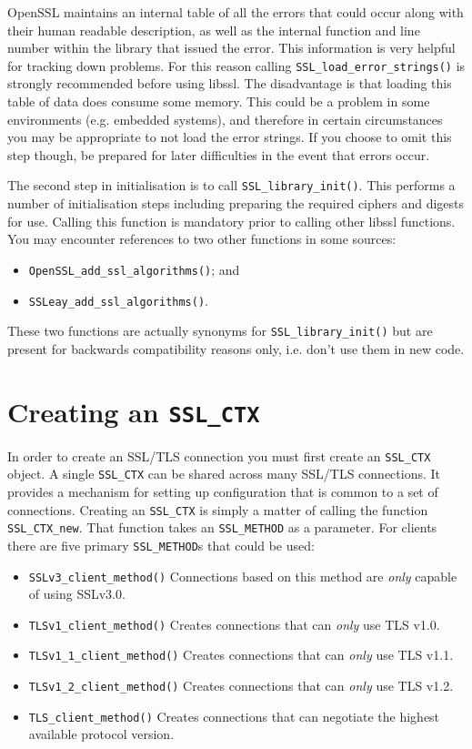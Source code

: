 OpenSSL maintains an internal table of all the errors that could occur along 
with their human readable description, as well as the internal function and 
line number within the library that issued the error. This information is very 
helpful for tracking down problems. For this reason calling 
\verb!SSL_load_error_strings()! is strongly recommended before using 
libssl. The disadvantage is that loading this table of data does consume some 
memory. This could be a problem in some environments (e.g. embedded systems), 
and therefore in certain circumstances you may be appropriate to not load the
error strings. If you choose to omit this step though, be prepared for later 
difficulties in the event that errors occur.

The second step in initialisation is to call \verb!SSL_library_init()!. 
This performs a number of initialisation steps including preparing the required 
ciphers and digests for use. Calling this function is mandatory prior to 
calling other libssl functions. You may encounter references to two other 
functions in some sources:
\begin{itemize}
\item\verb!OpenSSL_add_ssl_algorithms()!; and 
\item\verb!SSLeay_add_ssl_algorithms()!.
\end{itemize}
These two functions are actually  synonyms for \verb!SSL_library_init()! but are
present for backwards compatibility reasons only, i.e. don't use them in new
code.

\section{Creating an \texttt{SSL\_CTX}}

In order to create an SSL/TLS connection you must first create an
\verb!SSL_CTX! object. A single \verb!SSL_CTX! can be shared across
many SSL/TLS connections. It provides a mechanism for setting up configuration
that is common to a set of connections. Creating an \verb!SSL_CTX! is 
simply a matter of calling the function \verb!SSL_CTX_new!. That function 
takes an \verb!SSL_METHOD! as a parameter. For clients there are five 
primary \verb!SSL_METHOD!s that could be used:
\begin{itemize}
\item \verb!SSLv3_client_method()! Connections based on this method are 
\emph{only} capable of using SSLv3.0.
\item \verb!TLSv1_client_method()! Creates connections that can 
\emph{only} use TLS v1.0.
\item \verb!TLSv1_1_client_method()! Creates connections that can 
\emph{only} use TLS v1.1.
\item \verb!TLSv1_2_client_method()! Creates connections that can 
\emph{only} use TLS v1.2.
\item \verb!TLS_client_method()! Creates connections that can negotiate 
the highest available protocol version.
\end{itemize}

